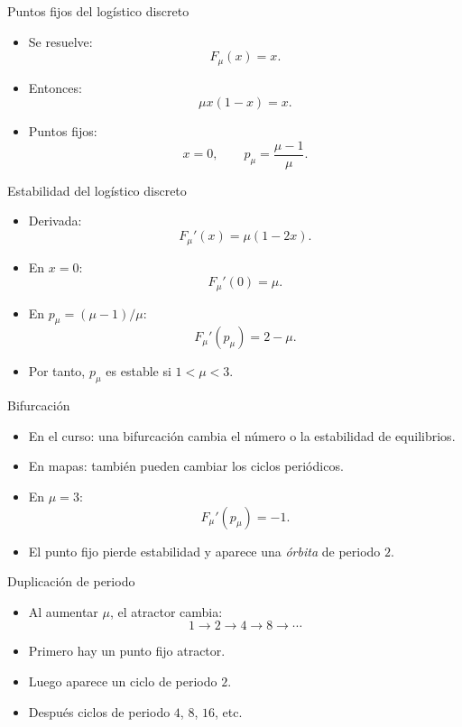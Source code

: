 \documentclass[aspectratio=169,11pt]{beamer}
\newcommand{\Fmu}{F_\mu}
\begin{document}
\begin{frame}{Puntos fijos del log\'istico discreto}
    \begin{itemize}
        \item Se resuelve:
        \[
        \Fmu(x)=x.
        \]
        \item Entonces:
        \[
        \mu x(1-x)=x.
        \]
        \item Puntos fijos:
        \[
        x=0,\qquad p_\mu=\frac{\mu-1}{\mu}.
        \]
    \end{itemize}
\end{frame}

\begin{frame}{Estabilidad del log\'istico discreto}
    \begin{itemize}
        \item Derivada:
        \[
        \Fmu'(x)=\mu(1-2x).
        \]
        \item En $x=0$:
        \[
        \Fmu'(0)=\mu.
        \]
        \item En $p_\mu=(\mu-1)/\mu$:
        \[
        \Fmu'(p_\mu)=2-\mu.
        \]
        \item Por tanto, $p_\mu$ es estable si $1<\mu<3$.
    \end{itemize}
\end{frame}

\begin{frame}{Bifurcaci\'on}
    \begin{itemize}
        \item En el curso: una bifurcaci\'on cambia el n\'umero o la estabilidad de equilibrios.
        \item En mapas: tambi\'en pueden cambiar los ciclos peri\'odicos.
        \item En $\mu=3$:
        \[
        \Fmu'(p_\mu)=-1.
        \]
        \item El punto fijo pierde estabilidad y aparece una \textit{\'orbita} de periodo $2$.
    \end{itemize}
\end{frame}

\begin{frame}{Duplicaci\'on de periodo}
    \begin{itemize}
        \item Al aumentar $\mu$, el atractor cambia:
        \[
        1\longrightarrow 2\longrightarrow 4\longrightarrow 8\longrightarrow\cdots
        \]
        \item Primero hay un punto fijo atractor.
        \item Luego aparece un ciclo de periodo $2$.
        \item Despu\'es ciclos de periodo $4$, $8$, $16$, etc.
    \end{itemize}
\end{frame}
\end{document}
